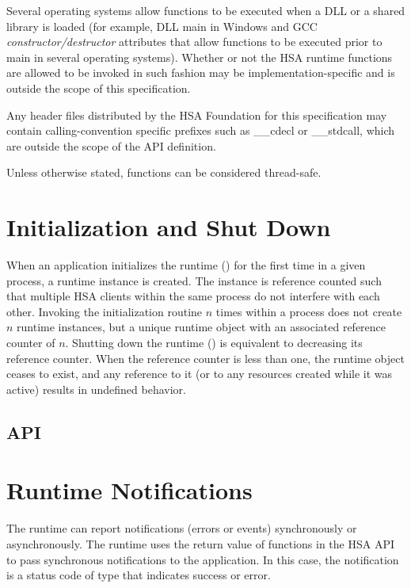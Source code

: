 \documentclass[oneside]{book}
\begin{document}
Several operating systems allow functions to be executed when a DLL or a shared
library is loaded (for example, DLL main in Windows and GCC
\emph{constructor/destructor} attributes that allow functions to be executed
prior to main in several operating systems). Whether or not the HSA runtime
functions are allowed to be invoked in such fashion may be
implementation-specific and is outside the scope of this specification.

Any header files distributed by the HSA Foundation for this specification may
contain calling-convention specific prefixes such as __cdecl or __stdcall, which
are outside the scope of the API definition.

Unless otherwise stated, functions can be considered thread-safe.

\section{Initialization and Shut Down}\label{sec:init}
When an application initializes the runtime () for the first
time in a given process, a runtime instance is created. The instance is
reference counted such that multiple HSA clients within the same
process do not interfere with each other. Invoking the initialization routine
$n$ times within a process does not create $n$ runtime instances, but a unique
runtime object with an associated reference counter of $n$. Shutting down the
runtime () is equivalent to decreasing its reference
counter. When the reference counter is less than one, the runtime object ceases
to exist, and any reference to it (or to any resources created while it was
active) results in undefined behavior.

\subsection{API}


\section{Runtime Notifications}
\label{sec:error}

The runtime can report notifications (errors or events) synchronously or
asynchronously. The runtime uses the return value of functions in the HSA API to
pass synchronous notifications to the application. In this case, the
notification is a status code of type  that indicates
success or error.
\end{document}
